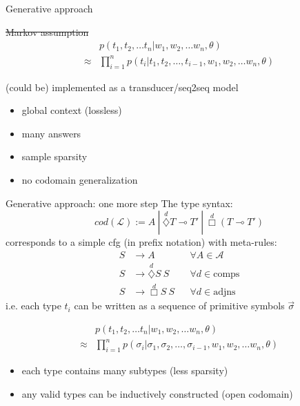 \documentclass{beamer}
\newcommand{\li}{\!\multimap\!}
\newcommand{\dia}{\ensuremath{\diamondsuit}}
\newcommand{\dx}[1]{\overset{#1}{\dia}}
\newcommand{\bx}[1]{\overset{#1}{\Box}}
\begin{document}
\begin{frame}{Generative approach}
	\small
	
	\begin{block}{\st{Markov assumption}}
		\begin{align*}
			& p(t_1, t_2, \dots t_n | w_1, w_2, \dots w_n, \theta) \\
			\approx &
			\prod_{i=1}^{n} p(t_i | t_1, t_2, \dots, t_{i-1}, w_1, w_2, \dots w_n, \theta)
		\end{align*}
	\end{block}
	
	(could be) implemented as a transducer/seq2seq model
	\begin{itemize}
		\item[\smiley]			global context (lossless)
		\item[\smiley]			many answers
		\item[\alert{\frownie}]	sample sparsity 
		\item[\alert{\frownie}]	no codomain generalization
	\end{itemize}
\end{frame}

\begin{frame}{Generative approach: one more step}
	\small
	The type syntax: 
	\[
		cod(\mathcal{L}) := A \ | \ \dx{d} T \li T' \ | \ \bx{d}\left( T \li T' \right)
	\]
	corresponds to a \alert{simple cfg} (in prefix notation) with meta-rules:
		\begin{align*}
			S & \to A 				& & \forall A \in \mathcal{A}\\
			S & \to \dx{d} S \ S	& & \forall d \in \mathrm{comps} \\
			S & \to \bx{d} S \ S 	& & 	\forall d \in \mathrm{adjns}
		\end{align*}
	i.e. each type $t_i$ can be written as a sequence of primitive symbols $\vec{\sigma}$
	
	\pause
	\begin{align*}
			& p(t_1, t_2, \dots t_n | w_1, w_2, \dots w_n, \theta) \\
			\approx &
			\prod_{i=1}^{n} p(\sigma_i | \sigma_1, \sigma_2, \dots, \sigma_{i-1}, w_1, w_2, \dots w_n, \theta)
	\end{align*}
	
	\begin{itemize}
		\item[\smiley]			each type contains many subtypes (less sparsity)
		\item[\smiley]			any valid types can be inductively constructed (open codomain)
	\end{itemize}
\end{frame}
\end{document}
